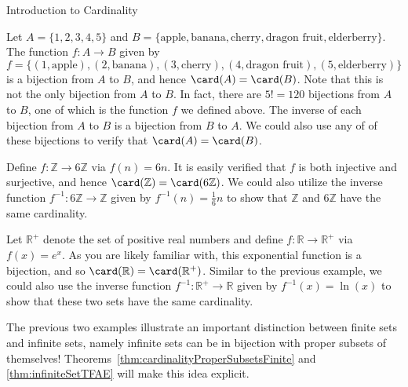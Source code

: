 \begin{section}{Introduction to Cardinality}
\begin{example}
Let $A=\{1,2,3,4,5\}$ and $B=\{\text{apple},\text{banana},\text{cherry},\text{dragon fruit},\text{elderberry}\}$.  The function $f:A\to B$ given by
\[
f=\{(1,\text{apple}),(2,\text{banana}),(3,\text{cherry}),(4,\text{dragon fruit}),(5,\text{elderberry})\}
\]
is a bijection from $A$ to $B$, and hence $\card(A)=\card(B)$.  Note that this is not the only bijection from $A$ to $B$.  In fact, there are $5!=120$ bijections from $A$ to $B$, one of which is the function $f$ we defined above. The inverse of each bijection from $A$ to $B$ is a bijection from $B$ to $A$.  We could also use any of of these bijections to verify that $\card(A)=\card(B)$.
\end{example}

\begin{example}
Define $f:\mathbb{Z}\to 6\mathbb{Z}$ via $f(n)=6n$.  It is easily verified that $f$ is both injective and surjective, and hence $\card(\mathbb{Z})=\card(6\mathbb{Z})$. We could also utilize the inverse function $f^{-1}:6\mathbb{Z}\to \mathbb{Z}$ given by $f^{-1}(n)=\frac{1}{6}n$ to show that $\mathbb{Z}$ and $6\mathbb{Z}$ have the same cardinality.
\end{example}

\begin{example}
Let $\mathbb{R}^+$ denote the set of positive real numbers and define $f:\mathbb{R}\to \mathbb{R}^+$ via $f(x)=e^x$. As you are likely familiar with, this exponential function is a bijection, and so $\card(\mathbb{R})=\card(\mathbb{R}^+)$.  Similar to the previous example, we could also use the inverse function $f^{-1}:\mathbb{R}^+\to \mathbb{R}$ given by $f^{-1}(x)=\ln(x)$ to show that these two sets have the same cardinality.
\end{example}

The previous two examples illustrate an important distinction between finite sets and infinite sets, namely infinite sets can be in bijection with proper subsets of themselves! Theorems~\ref{thm:cardinalityProperSubsetsFinite} and \ref{thm:infiniteSetTFAE} will make this idea explicit.


\end{section}
